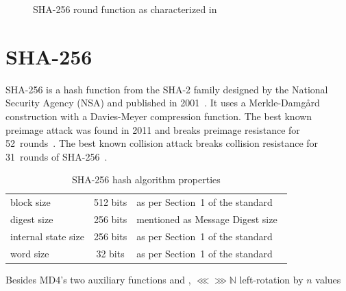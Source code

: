 \begin{figure}[p]
\begin{center}
    \caption{SHA-256 round function as characterized in~\cite{analysisSHA256}}
    \label{fig:sha256-round-function}
  \end{center}
\end{figure}

\section{SHA-256}
\label{sec:dc-sha-256}
%
SHA-256 is a hash function from the SHA-2 family designed by the National Security Agency (NSA)
and published in 2001~\cite{fips-pub-180-4}. It uses a Merkle-Damg\aa{}rd construction
with a Davies-Meyer compression function. The best known preimage attack was found in 2011
and breaks preimage resistance for 52~rounds~\cite{bicliques}. The best known collision attack
breaks collision resistance for 31~rounds of SHA-256~\cite{improving}.
%
\begin{table}[h]
  \begin{center}
    \begin{tabular}{lcl}
      block size           & 512 bits   & as per Section~1 of the standard~\cite{fips-pub-180-4} \\
      digest size          & 256 bits   & mentioned as Message Digest size~\cite{fips-pub-180-4} \\
      internal state size  & 256 bits   & as per Section~1 of the standard~\cite{fips-pub-180-4} \\
      word size            & 32 bits    & as per Section~1 of the standard~\cite{fips-pub-180-4}
    \end{tabular}
    \caption{SHA-256 hash algorithm properties}
    \label{tab:sha256}
  \end{center}
\end{table}

Besides MD4's two auxiliary functions  and ,
$⋘	⋙
 \mathbb{N} $
left-rotation by $n$ values

%

